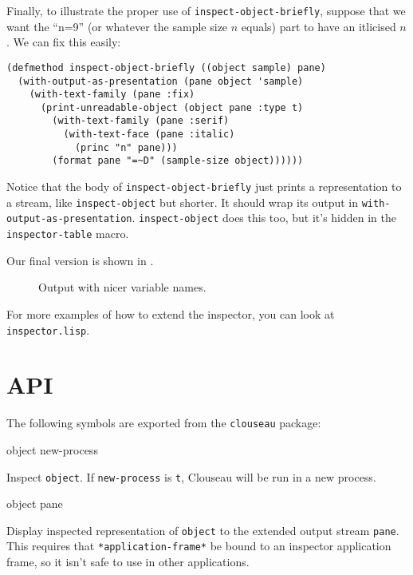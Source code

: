 Finally, to illustrate the proper use of
\texttt{inspect-object-briefly}, suppose that we want the ``n=9'' (or
whatever the sample size $n$ equals) part to have an itlicised
$n$. We can fix this easily:

\begin{verbatim}
(defmethod inspect-object-briefly ((object sample) pane)
  (with-output-as-presentation (pane object 'sample)
    (with-text-family (pane :fix)
      (print-unreadable-object (object pane :type t)
        (with-text-family (pane :serif)
          (with-text-face (pane :italic)
            (princ "n" pane)))
        (format pane "=~D" (sample-size object))))))
\end{verbatim}

Notice that the body of \texttt{inspect-object-briefly} just prints a
representation to a stream, like \texttt{inspect-object} but shorter.
It should wrap its output in \texttt{with-output-as-presentation}.
\texttt{inspect-object} does this too, but it's hidden in the
\texttt{inspector-table} macro.

Our final version is shown in .

\begin{figure}
\begin{center}
\end{center}
\caption{\label{fig-inspect-object-3}
Output with nicer variable names.}
\end{figure}

For more examples of how to extend the inspector, you can look at
\texttt{inspector.lisp}.

\section{API}

The following symbols are exported from the \texttt{clouseau} package:

 {object \key new-process}

Inspect \texttt{object}. If \texttt{new-process} is \texttt{t},
Clouseau will be run in a new process.

 {object pane}

Display inspected representation of \texttt{object} to the extended output
stream \texttt{pane}. This requires that \texttt{*application-frame*} be bound
to an inspector application frame, so it isn't safe to use in other
applications.

